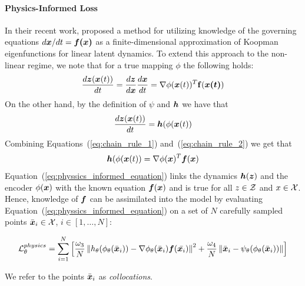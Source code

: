 \paragraph{Physics-Informed Loss} In their recent work, \cite{liu2022physics} proposed a method for utilizing knowledge of the governing equations $d\boldsymbol{x}/dt = \boldsymbol{f(x)}$ as a finite-dimensional approximation of Koopman eigenfunctions for linear latent dynamics. To extend this approach to the non-linear regime, we note that for a true mapping $\phi$ the following holds:
\begin{equation}
    \label{eq:chain_rule_1}
    \frac{d\boldsymbol{z}(\boldsymbol{x}(t))}{dt} = \frac{d\boldsymbol{z}}{d\boldsymbol{x}}\frac{d\boldsymbol{x}}{dt} = \nabla\phi(\boldsymbol{x}(t))^T\bf{f}(\boldsymbol{x(t)})
\end{equation}
On the other hand, by the definition of $\psi$ and $\boldsymbol{h}$ we have that
\begin{equation}
    \label{eq:chain_rule_2}
    \frac{d\boldsymbol{z}(\boldsymbol{x}(t))}{dt} = \boldsymbol{h}(\phi(\boldsymbol{x}(t))
\end{equation}
Combining Equations~(\ref{eq:chain_rule_1}) and~(\ref{eq:chain_rule_2}) we get that
\begin{equation}
    \label{eq:physsics_informed_equation}
    \boldsymbol{h}(\phi(\boldsymbol{x}(t)) = \nabla\phi(\boldsymbol{x})^T\boldsymbol{f}(\boldsymbol{x})
\end{equation}
Equation~(\ref{eq:physsics_informed_equation}) links the dynamics $\boldsymbol{h}(\boldsymbol{z})$ and the encoder $\phi(\boldsymbol{x})$ with the known equation $\boldsymbol{f}(\boldsymbol{x})$ and is true for all $z \in \operatorname{\mathcal{Z}}$ and $x \in \operatorname{\mathcal{X}}$. Hence, knowledge of $\boldsymbol{f}$ can be assimilated into the model by evaluating Equation~(\ref{eq:physsics_informed_equation}) on a set of $N$ carefully sampled points $\bar{\boldsymbol{x}}_i \in \operatorname{\mathcal{X}}$, $i \in [1, \dots, N]$:

\begin{equation}
    \label{eq:loss_physics_informed}
    \operatorname{\mathcal{L}}^{physics}_\theta = \sum_{i = 1}^N \left[\frac{\omega_3}{N}\left\|h_\theta(\phi_\theta(\bar{\boldsymbol{x}}_i)) - \nabla \phi_\theta(\bar{\boldsymbol{x}}_i) \boldsymbol{f}(\bar{\boldsymbol{x}_i})\right\|^2 + \frac{\omega_4}{N}\left\|\bar{\boldsymbol{x}}_i - \psi_\theta(\phi_\theta(\bar{\boldsymbol{x}}_i))\right\|\right]
\end{equation}

We refer to the points $\bar{\boldsymbol{x}}_i$ as \textit{collocations}.

